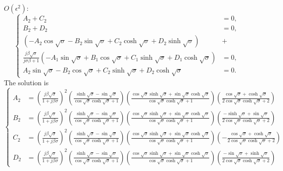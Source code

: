 \documentclass{article}
\begin{document}
\noindent
$O(\epsilon^2)$:
\begin{equation}
    \left\{\begin{aligned}
        A_2 + C_2 &= 0, \\
        B_2 + D_2 &= 0, \\
        \left( - A_2 \cos{\sqrt{\sigma}} - B_2 \sin{\sqrt{\sigma}} + C_2 \cosh{\sqrt{\sigma}} + D_2 \sinh{\sqrt{\sigma}} \right) &+ \\
        \frac{j \beta \sqrt{\sigma}}{ j\sigma \beta + 1 } \left( - A_1 \sin{\sqrt{\sigma}} + B_1 \cos{\sqrt{\sigma}} + C_1 \sinh{\sqrt{\sigma}} + D_1 \cosh{\sqrt{\sigma}} \right) &= 0, \\
        A_2 \sin{\sqrt{\sigma}} - B_2 \cos{\sqrt{\sigma}} + C_2 \sinh{\sqrt{\sigma}} + D_2 \cosh{\sqrt{\sigma}} &= 0.
    \end{aligned}\right.
\end{equation}
The solution is
\scriptsize
\begin{equation}
    \left\{\begin{aligned}
        A_2 &= \left( \frac{j \beta \sqrt{\sigma }}{1+j \beta \sigma } \right)^2 \left(\frac{ \sinh\sqrt{\sigma } - \sin\sqrt{\sigma }}{\cos\sqrt{\sigma } \cosh\sqrt{\sigma }+1} \right) \left( \frac{\cos\sqrt{\sigma } \sinh\sqrt{\sigma }+\sin\sqrt{\sigma } \cosh\sqrt{\sigma }}{\cos\sqrt{\sigma } \cosh\sqrt{\sigma }+1} \right) \left(\frac{\cos\sqrt{\sigma }+\cosh\sqrt{\sigma }}{2 \cos\sqrt{\sigma }\cosh\sqrt{\sigma }+2} \right) \\
        B_2 &= \left( \frac{j \beta \sqrt{\sigma }}{1+j \beta \sigma } \right)^2 \left(\frac{\sinh\sqrt{\sigma } - \sin\sqrt{\sigma }}{\cos\sqrt{\sigma } \cosh\sqrt{\sigma }+1} \right) \left( \frac{\cos\sqrt{\sigma } \sinh\sqrt{\sigma }+\sin\sqrt{\sigma } \cosh\sqrt{\sigma }}{\cos\sqrt{\sigma } \cosh\sqrt{\sigma }+1} \right) \left( \frac{-\sinh\sqrt{\sigma }+\sin\sqrt{\sigma }}{2 \cos\sqrt{\sigma }\cosh\sqrt{\sigma }+2} \right)\\
        C_2 &= \left( \frac{j \beta \sqrt{\sigma }}{1+j \beta \sigma } \right)^2 \left(\frac{\sinh\sqrt{\sigma } - \sin\sqrt{\sigma }}{\cos\sqrt{\sigma } \cosh\sqrt{\sigma }+1} \right) \left( \frac{\cos\sqrt{\sigma } \sinh\sqrt{\sigma }+\sin\sqrt{\sigma } \cosh\sqrt{\sigma }}{\cos\sqrt{\sigma } \cosh\sqrt{\sigma }+1} \right) \left( -\frac{\cos\sqrt{\sigma }+\cosh\sqrt{\sigma }}{2 \cos\sqrt{\sigma } \cosh\sqrt{\sigma }+2} \right)\\
        D_2 &= \left( \frac{j \beta \sqrt{\sigma }}{1+j \beta \sigma } \right)^2 \left(\frac{\sinh\sqrt{\sigma } - \sin\sqrt{\sigma }}{\cos\sqrt{\sigma } \cosh\sqrt{\sigma }+1} \right) \left( \frac{\cos\sqrt{\sigma } \sinh\sqrt{\sigma }+\sin\sqrt{\sigma } \cosh\sqrt{\sigma }}{\cos\sqrt{\sigma } \cosh\sqrt{\sigma }+1} \right) \left( \frac{-\sin\sqrt{\sigma }+\sinh\sqrt{\sigma }}{2 \cos\sqrt{\sigma }\cosh\sqrt{\sigma }+2} \right)
    \end{aligned}\right.
\end{equation}
\normalsize
\end{document}
